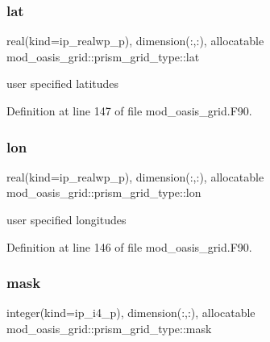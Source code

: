 \subsubsection{\texorpdfstring{lat}{lat}}
{\footnotesize\ttfamily real(kind=ip\+\_\+realwp\+\_\+p), dimension(\+:,\+:), allocatable mod\+\_\+oasis\+\_\+grid\+::prism\+\_\+grid\+\_\+type\+::lat\hspace{0.3cm}{\ttfamily [private]}}



user specified latitudes 



Definition at line 147 of file mod\+\_\+oasis\+\_\+grid.\+F90.

\mbox{\label{structmod__oasis__grid_1_1prism__grid__type_a4f7fb8a71335506209709cfbe939ef7b}} 
\subsubsection{\texorpdfstring{lon}{lon}}
{\footnotesize\ttfamily real(kind=ip\+\_\+realwp\+\_\+p), dimension(\+:,\+:), allocatable mod\+\_\+oasis\+\_\+grid\+::prism\+\_\+grid\+\_\+type\+::lon\hspace{0.3cm}{\ttfamily [private]}}



user specified longitudes 



Definition at line 146 of file mod\+\_\+oasis\+\_\+grid.\+F90.

\mbox{\label{structmod__oasis__grid_1_1prism__grid__type_ae50e83035d6214d862be48a5060887ae}} 
\subsubsection{\texorpdfstring{mask}{mask}}
{\footnotesize\ttfamily integer(kind=ip\+\_\+i4\+\_\+p), dimension(\+:,\+:), allocatable mod\+\_\+oasis\+\_\+grid\+::prism\+\_\+grid\+\_\+type\+::mask\hspace{0.3cm}{\ttfamily [private]}}



